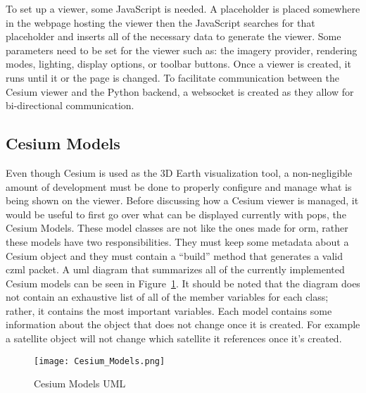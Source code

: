 To set up a viewer, some JavaScript is needed. A placeholder is placed
somewhere in the webpage hosting the viewer then the JavaScript searches for
that placeholder and inserts all of the necessary data to generate the viewer.
Some parameters need to be set for the viewer such as: the imagery provider,
rendering modes, lighting, display options, or toolbar buttons. Once a viewer
is created, it runs until it or the page is changed.  To facilitate
communication between the Cesium viewer and the Python backend, a websocket is
created as they allow for bi-directional communication. 

\subsection{Cesium Models}\label{sec:cesium-models}

Even though Cesium is used as the 3D Earth visualization tool, a
non-negligible amount of development must be done to properly configure and
manage what is being shown on the viewer. Before discussing how a Cesium viewer
is managed, it would be useful to first go over what can be displayed currently
with \gls{pops}, the Cesium Models. These model classes are not like the ones
made for \gls{orm}, rather these models have two responsibilities. They must
keep some metadata about a Cesium object and they must contain a ``build''
method that generates a valid \gls{czml} packet.  A \gls{uml} diagram that
summarizes all of the currently implemented Cesium models can be seen in
Figure~\ref{fig:cesium_models}. It should be noted that the diagram does not
contain an exhaustive list of all of the member variables for each class;
rather, it contains the most important variables.  Each model contains some
information about the object that does not change once it is created. For
example a satellite object will not change which satellite it references once
it's created. 

\begin{figure} 
    \centering
    \texttt{[image: Cesium\_Models.png]} 
    \caption{Cesium Models UML} 
    \label{fig:cesium_models} 
\end{figure}

